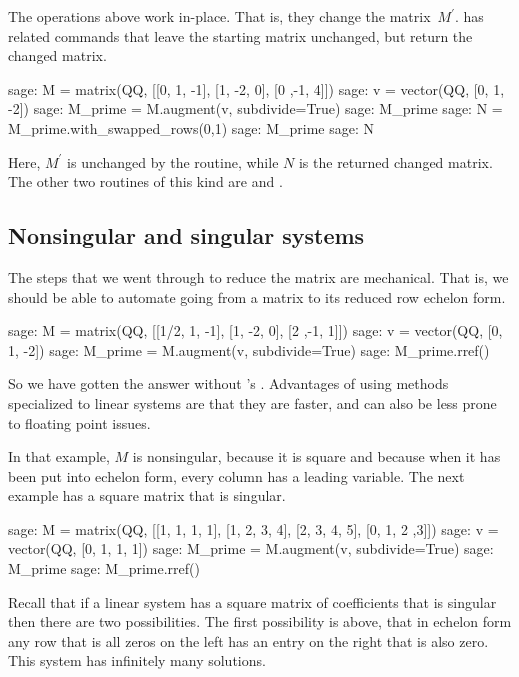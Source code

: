 The operations above
work in-place.
That is, they change the matrix~$M^\prime$.
\Sage{} has related commands that leave the starting matrix unchanged,
but return the changed matrix.
\begin{sagecommandline}
sage: M = matrix(QQ, [[0, 1, -1], [1, -2, 0], [0 ,-1, 4]])
sage: v = vector(QQ, [0, 1, -2])
sage: M_prime = M.augment(v, subdivide=True) 
sage: M_prime
sage: N = M_prime.with_swapped_rows(0,1)
sage: M_prime
sage: N      
\end{sagecommandline}
Here, $M^\prime$ is unchanged by the routine, while $N$ is the returned 
changed matrix.
The other two routines of this kind are  
and .




\subsection{Nonsingular and singular systems}
The steps that we went through to reduce the matrix are mechanical.
That is, we should be able to automate going from a matrix to its
reduced row echelon form.
\begin{sagecommandline}
sage: M = matrix(QQ, [[1/2, 1, -1], [1, -2, 0], [2 ,-1, 1]])
sage: v = vector(QQ, [0, 1, -2])
sage: M_prime = M.augment(v, subdivide=True) 
sage: M_prime.rref()
\end{sagecommandline}
So we have gotten the answer without \Sage's .
Advantages of using methods specialized
to linear systems are that they are faster, and can also be less prone to floating point
issues.

In that example, $M$ is nonsingular, because it is 
square and because when it has been put into echelon form, every
column has a leading variable.
The next example has a
square matrix that is singular. 
\begin{sagecommandline}
sage: M = matrix(QQ, [[1, 1, 1, 1], [1, 2, 3, 4], [2, 3, 4, 5], [0, 1, 2 ,3]]) 
sage: v = vector(QQ, [0, 1, 1, 1]) 
sage: M_prime = M.augment(v, subdivide=True)
sage: M_prime
sage: M_prime.rref()
\end{sagecommandline}
Recall that if a linear system has a square matrix of coefficients 
that is singular then there are two possibilities.
The first possibility is above, that in echelon form
any row that is all zeros on the
left has an entry on the right that is also zero.
This system has infinitely many solutions.

